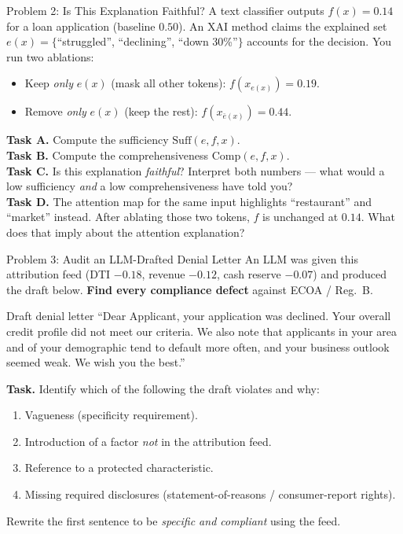 \documentclass[9pt,t]{beamer}
\begin{document}
\begin{frame}{Problem 2: Is This Explanation Faithful?}
A text classifier outputs $f(x)=0.14$ for a loan application (baseline $0.50$).
An XAI method claims the explained set $e(x) = \{$``struggled'', ``declining'',
``down 30\%''$\}$ accounts for the decision. You run two ablations:

\medskip
\begin{itemize}
  \item Keep \emph{only} $e(x)$ (mask all other tokens): $f(x_{e(x)}) = 0.19$.
  \item Remove \emph{only} $e(x)$ (keep the rest): $f(x_{\bar{e}(x)}) = 0.44$.
\end{itemize}

\medskip
\textbf{Task A.} Compute the sufficiency $\text{Suff}(e,f,x)$.\\
\textbf{Task B.} Compute the comprehensiveness $\text{Comp}(e,f,x)$.\\
\textbf{Task C.} Is this explanation \emph{faithful}? Interpret both numbers ---
what would a low sufficiency \emph{and} a low comprehensiveness have told you?\\
\textbf{Task D.} The attention map for the same input highlights ``restaurant''
and ``market'' instead. After ablating those two tokens, $f$ is unchanged at
$0.14$. What does that imply about the attention explanation?
\end{frame}

\begin{frame}{Problem 3: Audit an LLM-Drafted Denial Letter}
An LLM was given this attribution feed (DTI $-0.18$, revenue $-0.12$, cash
reserve $-0.07$) and produced the draft below. \textbf{Find every compliance
defect} against ECOA / Reg.\ B.

\medskip
\begin{exampleblock}{Draft denial letter}
``Dear Applicant, your application was declined. Your overall credit profile did
not meet our criteria. We also note that applicants in your area and of your
demographic tend to default more often, and your business outlook seemed weak.
We wish you the best.''
\end{exampleblock}

\medskip
\textbf{Task.} Identify which of the following the draft violates and why:
\begin{enumerate}\small
  \item Vagueness (specificity requirement).
  \item Introduction of a factor \emph{not} in the attribution feed.
  \item Reference to a protected characteristic.
  \item Missing required disclosures (statement-of-reasons / consumer-report rights).
\end{enumerate}
Rewrite the first sentence to be \emph{specific and compliant} using the feed.
\end{frame}
\end{document}
